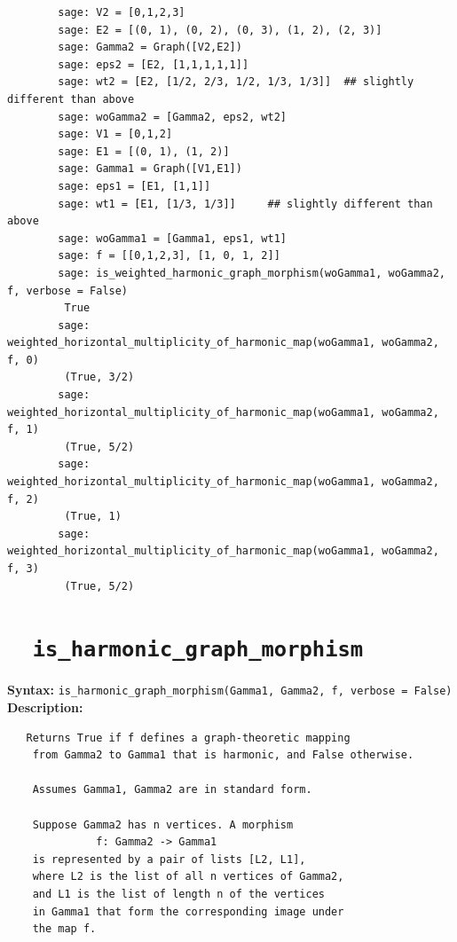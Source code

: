 \documentclass{article}
\begin{document}
\begin{verbatim}
        sage: V2 = [0,1,2,3]
        sage: E2 = [(0, 1), (0, 2), (0, 3), (1, 2), (2, 3)]
        sage: Gamma2 = Graph([V2,E2])
        sage: eps2 = [E2, [1,1,1,1,1]]
        sage: wt2 = [E2, [1/2, 2/3, 1/2, 1/3, 1/3]]  ## slightly different than above
        sage: woGamma2 = [Gamma2, eps2, wt2]
        sage: V1 = [0,1,2]
        sage: E1 = [(0, 1), (1, 2)]
        sage: Gamma1 = Graph([V1,E1])
        sage: eps1 = [E1, [1,1]]
        sage: wt1 = [E1, [1/3, 1/3]]     ## slightly different than above
        sage: woGamma1 = [Gamma1, eps1, wt1]
        sage: f = [[0,1,2,3], [1, 0, 1, 2]]       
        sage: is_weighted_harmonic_graph_morphism(woGamma1, woGamma2, f, verbose = False)
         True
        sage: weighted_horizontal_multiplicity_of_harmonic_map(woGamma1, woGamma2, f, 0)   
         (True, 3/2)
        sage: weighted_horizontal_multiplicity_of_harmonic_map(woGamma1, woGamma2, f, 1)   
         (True, 5/2)
        sage: weighted_horizontal_multiplicity_of_harmonic_map(woGamma1, woGamma2, f, 2)    
         (True, 1)
        sage: weighted_horizontal_multiplicity_of_harmonic_map(woGamma1, woGamma2, f, 3)  
         (True, 5/2)
\end{verbatim}

\section{\tt \ \ is\_harmonic\_graph\_morphism}

\textbf{Syntax:} \verb}is_harmonic_graph_morphism(Gamma1, Gamma2, f, verbose = False)}\\

\textbf{Description:}
\begin{verbatim}
   Returns True if f defines a graph-theoretic mapping
    from Gamma2 to Gamma1 that is harmonic, and False otherwise. 

    Assumes Gamma1, Gamma2 are in standard form.

    Suppose Gamma2 has n vertices. A morphism 
              f: Gamma2 -> Gamma1
    is represented by a pair of lists [L2, L1],
    where L2 is the list of all n vertices of Gamma2,
    and L1 is the list of length n of the vertices
    in Gamma1 that form the corresponding image under
    the map f.
\end{verbatim}
\end{document}
